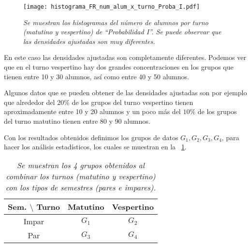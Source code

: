\begin{figure}[H]
\centering
\texttt{[image: histograma\_FR\_num\_alum\_x\_turno\_Proba\_I.pdf]} %
\caption[\textit{Histogramas del número de alumnos por turno: Probabilidad I}]{\textit{Se muestran los histogramas del número de alumnos por turno (matutino y vespertino) de ``Probabilidad I''. Se puede observar que las densidades ajustadas son muy diferentes.}}\label{HistAlumTurnoProbaI}
\end{figure}

En este caso las densidades ajustadas son completamente diferentes. Podemos ver que en el turno vespertino hay dos grandes concentraciones en los grupos que tienen entre 10 y 30 alumnos, así como entre 40 y 50 alumnos.

Algunos datos que se pueden obtener de las densidades ajustadas son por ejemplo que alrededor del $20\%$ de los grupos del turno vespertino tienen aproximadamente entre 10 y 20 alumnos y un poco más del $10\%$ de los grupos del turno matutino tienen entre 80 y 90 alumnos.


Con los resultados obtenidos definimos los grupos de datos $G_{1}, G_{2}, G_{3}, G_{4}$, para hacer los análisis estadísticos, los cuales se muestran en la \tablename{~\ref{GposDatos}}.

\begin{table}[H]
\centering
\begin{tabular}{|c|c|c|}
\hline 
\textbf{Sem.} $\setminus$ \textbf{Turno} & \textbf{Matutino} & \textbf{Vespertino} \\ 
\hline 
Impar & $G_{1}$ & $G_{2}$ \\ 
\hline 
Par & $G_{3}$ & $G_{4}$ \\ 
\hline 
\end{tabular}
\caption[\textit{Grupos de datos}]{\textit{Se muestran los 4 grupos obtenidos al combinar los turnos (matutino y vespertino) con los tipos de semestres (pares e impares).}}\label{GposDatos}
\end{table}



